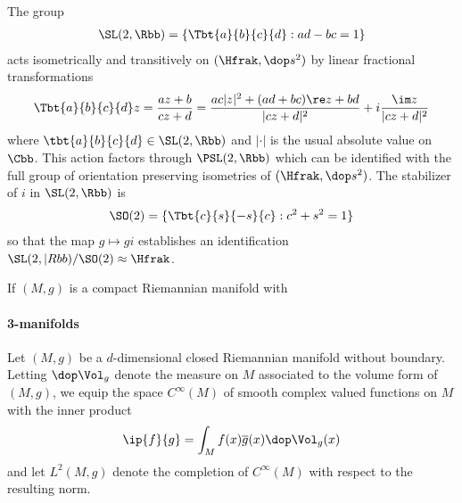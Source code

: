 The group
\begin{align*}
    \SL(2,\Rbb) = \left\{ \Tbt{a}{b}{c}{d}: ad-bc =1 \right\}
\end{align*}
acts isometrically and transitively on $(\Hfrak,\dop s^2)$ by linear fractional transformations
\begin{align*}
    \Tbt{a}{b}{c}{d} z = \frac{az+b}{cz+d} = \frac{ac |z|^2 +(ad+bc)\re z  +bd}{|cz+d|^2} + i \frac{\im z}{|cz+d|^2}
\end{align*}
where $\tbt{a}{b}{c}{d} \in \SL(2,\Rbb)$ and $|\cdot|$ is the usual absolute value on $\Cbb$. This action factors through $\PSL(2,\Rbb)$ which can be identified with the full group of orientation preserving isometries of $(\Hfrak,\dop s^2)$. The stabilizer of $i$ in $\SL(2,\Rbb)$ is
\begin{align*}
    \SO(2) = \{\Tbt{c}{s}{-s}{c}: c^2 + s^2 =1\}
\end{align*}
so that the map $g \mapsto g i$ establishes an identification $\SL(2,|Rbb) / \SO(2) \approx \Hfrak$.

If $(M,g)$ is a compact Riemannian manifold with 
\paragraph{3-manifolds}



\newpage
Let $(M,g)$ be a $d$-dimensional closed Riemannian manifold without boundary.  Letting $\dop \Vol_g$ denote the measure on $M$ associated to the volume form of $(M,g)$, we equip the space $C^\infty(M)$ of smooth complex valued functions on $M$ with the inner product
\begin{align}\label{eq:ip}
    \ip{f}{g} = \int_M f(x) \overline{g}(x) \dop \Vol_g(x)
\end{align}
and let $L^2(M,g)$ denote the completion of $C^\infty(M)$ with respect to the resulting norm.

